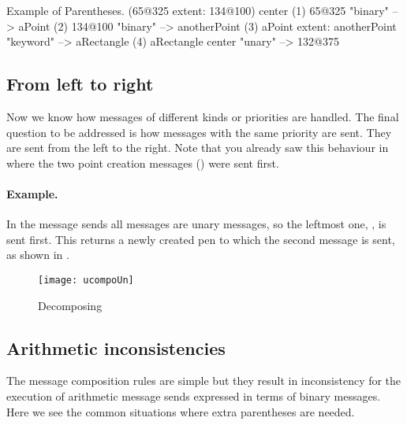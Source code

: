 \documentclass[a4paper,10pt,twoside]{book}
\begin{document}
\begin{example}[decExtent]{Example of Parentheses.}{}
      (65@325 extent: 134@100) center
(1)   65@325                                                    "binary"
    --> aPoint
(2)                                134@100                     "binary"
                                 --> anotherPoint
(3)   aPoint extent: anotherPoint                       "keyword"
      --> aRectangle
(4)   aRectangle center                                     "unary"
      --> 132@375
\end{example}

\subsection{From left to right}
Now we know how messages of different kinds or priorities are handled. The final question to be addressed is how messages with the same priority are sent. They are sent from the left to the right. Note that you already saw this behaviour in  where the two point creation messages () were sent first.



\paragraph{Example.} In the message sends  all messages are unary messages, so the leftmost one, , is sent first. This returns a newly created pen to which the second message  is sent, as shown in .

\begin{figure}
	\centering
	\texttt{[image: ucompoUn]}
	\caption{Decomposing \label{fig:unaryMessages}}
\end{figure}

\subsection{Arithmetic inconsistencies}
The message composition rules are simple but they result in inconsistency for the execution of arithmetic message sends expressed in terms of binary messages. Here we see the common situations where extra parentheses are needed. 
\end{document}
